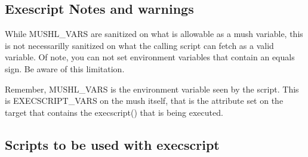 \documentclass[letterpaper,10pt,english]{sphinxmanual}
\begin{document}
\subsection{Exescript Notes and warnings}
\label{\detokenize{advanced:exescript-notes-and-warnings}}
\sphinxAtStartPar
While MUSHL\_VARS are sanitized on what is allowable as a mush variable, this
is not necessarilly sanitized on what the calling script can fetch as a valid
variable.  Of note, you can not set environment variables that contain an
equals sign.  Be aware of this limitation.

\sphinxAtStartPar
Remember, MUSHL\_VARS is the environment variable seen by the script.
This is EXECSCRIPT\_VARS on the mush itself, that is the attribute set
on the target that contains the execscript() that is being executed.


\subsection{Scripts to be used with execscript}
\label{\detokenize{advanced:scripts-to-be-used-with-execscript}}
\end{document}
